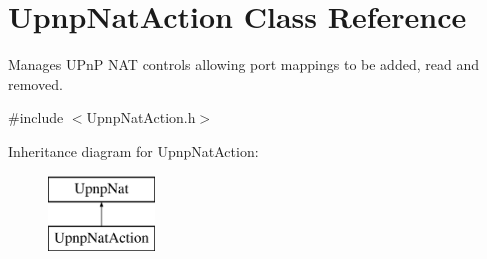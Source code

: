 \hypertarget{class_upnp_nat_action}{
\section{UpnpNatAction Class Reference}
\label{class_upnp_nat_action}
}


Manages UPnP NAT controls allowing port mappings to be added, read and removed.  




{\ttfamily \#include $<$UpnpNatAction.h$>$}

Inheritance diagram for UpnpNatAction:\begin{figure}[H]
\begin{center}
\leavevmode
\includegraphics[height=2.000000cm]{class_upnp_nat_action}
\end{center}
\end{figure}
